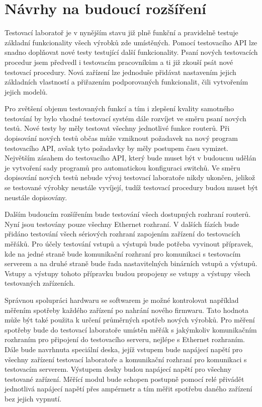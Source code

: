 \chapter{Návrhy na budoucí rozšíření}
Testovací laboratoř je v nynějším stavu již plně funkční a pravidelně testuje základní funkcionality všech výrobků zde umístěných. Pomocí testovacího API lze snadno doplňovat nové testy testující další funkcionality. Psaní nových testovacích procedur jsem předvedl i testovacím pracovníkům a ti již zkouší psát nové testovací procedury. Nová zařízení lze jednoduše přidávat nastavením jejich základních vlastností a přiřazením podporovaných funkcionalit, čili vytvořením jejich modelů.

Pro zvětšení objemu testovaných funkcí a tím i zlepšení kvality samotného testování by bylo vhodné testovací systém dále rozvíjet ve směru psaní nových testů. Nové testy by měly testovat všechny jednotlivé funkce routerů. Při dopisování nových testů občas může vzniknout požadavek na nový program testovacího API, avšak tyto požadavky by měly postupem času vymizet. Největším zásahem do testovacího API, který bude muset být v budoucnu udělán je vytvoření sady programů pro automatickou konfiguraci switchů. Ve směru dopisování nových testů nebude vývoj testovací laboratoře nikdy ukončen, jelikož se testované výrobky neustále vyvíjejí, tudíž testovací procedury budou muset být neustále dopisovány.

Dalším budoucím rozšířením bude testování všech dostupných rozhraní routerů. Nyní jsou testovány pouze všechny Ethernet rozhraní. V dalších fázích bude přidáno testování všech sériových rozhraní zapojením zařízení do testovacích měřáků. Pro účely testování vstupů a výstupů bude potřeba vyvinout přípravek, kde na jedné straně bude komunikační rozhraní pro komunikaci s testovacím serverem a na druhé straně bude řada nastavitelných binárních vstupů a výstupů. Vstupy a výstupy tohoto přípravku budou propojeny se vstupy a výstupy všech testovaných zařízeních.

Správnou spolupráci hardwaru se softwarem je možné kontrolovat například měřením spotřeby každého zařízení po nahrání nového firmwaru. Tato hodnota může být také použita k určení průměrných spotřeb nových výrobků. Pro měření spotřeby bude do testovací laboratoře umístěn měřák s jakýmkoliv komunikačním rozhraním pro připojení do testovacího serveru, nejlépe s Ethernet rozhraním. Dále bude navrhnuta speciální deska, jejíž vstupem bude napájecí napětí pro všechny zařízení testovací laboratoře a komunikační rozhraní pro komunikaci s testovacím serverem. Výstupem desky budou napájecí napětí pro všechny testované zařízení. Měřící modul bude schopen postupně pomocí relé přivádět jednotlivá napájecí napětí přes ampérmetr a tím měřit spotřebu daného zařízení bez jejich vypnutí.

\endinput
